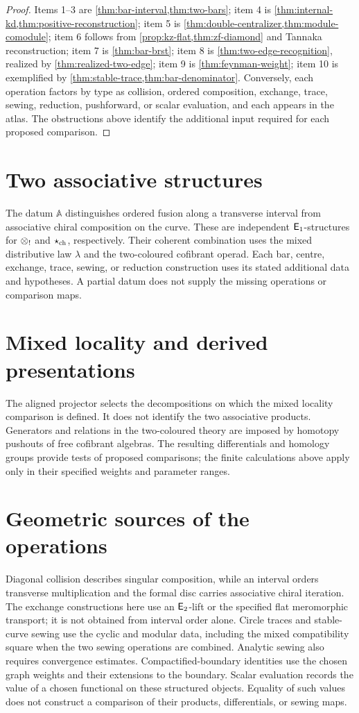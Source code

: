 \begin{proof}
Items 1--3 are \cref{thm:bar-interval,thm:two-bars}; item 4 is
\cref{thm:internal-kd,thm:positive-reconstruction}; item 5 is
\cref{thm:double-centralizer,thm:module-comodule}; item 6 follows from
\cref{prop:kz-flat,thm:zf-diamond} and Tannaka reconstruction; item 7 is
\cref{thm:bar-brst}; item 8 is \cref{thm:two-edge-recognition}, realized by
\cref{thm:realized-two-edge}; item 9 is \cref{thm:feynman-weight}; item 10
is exemplified by \cref{thm:stable-trace,thm:bar-denominator}.  Conversely,
each operation factors by type as collision, ordered composition, exchange,
trace, sewing, reduction, pushforward, or scalar evaluation, and each appears
in the atlas.  The obstructions above identify the additional input required for each
proposed comparison.
\end{proof}

\section{Two associative structures}
The datum \(\mathbb A\) distinguishes ordered fusion along a transverse
interval from associative chiral composition on the curve.  These are
independent \(\mathsf E_1\)-structures for \(\mathbin{\otimes_{!}}\) and \(\mathbin{\star_{\mathrm{ch}}}\),
respectively.  Their coherent combination uses the mixed distributive law
\(\lambda\) and the two-coloured cofibrant operad.  Each bar, centre,
exchange, trace, sewing, or reduction construction uses its stated additional
data and hypotheses.  A partial datum does not supply the missing operations
or comparison maps.

\section{Mixed locality and derived presentations}
The aligned projector selects the decompositions on which the mixed locality
comparison is defined.  It does not identify the two associative products.
Generators and relations in the two-coloured theory are imposed by homotopy
pushouts of free cofibrant algebras.  The resulting differentials and
homology groups provide tests of proposed comparisons; the finite calculations
above apply only in their specified weights and parameter ranges.

\section{Geometric sources of the operations}
Diagonal collision describes singular composition, while an interval orders
transverse multiplication and the formal disc carries associative chiral
iteration.  The exchange constructions here use an \(\mathsf E_2\)-lift or the specified flat
meromorphic transport; it is not obtained from interval order alone.
Circle traces and stable-curve sewing use the cyclic and modular data,
including the mixed compatibility square when the two sewing operations are
combined.  Analytic sewing also requires convergence estimates.
Compactified-boundary identities use the chosen graph weights and their
extensions to the boundary.  Scalar evaluation records the value of a chosen
functional on these structured objects.  Equality of such values does not
construct a comparison of their products, differentials, or sewing maps.
